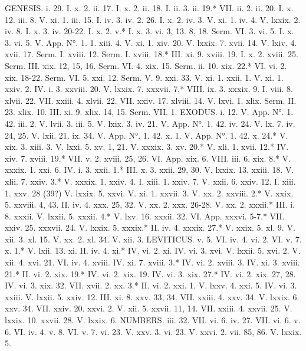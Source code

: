 GENESIS.
i. 29.	I. x. 2.
ii. 17.	I. x. 2.
ii. 18.	I. ii. 3.
ii. 19.*	VII. ii. 2.
ii. 20.	I. x. 12.
iii. 8.	V. xi. 1.
iii. 15.	I. iv. 3.
iv. 2. 26.	I. x. 2.
iv. 3.	V. xi. 1.
iv. 4.	V. lxxix. 2.
iv. 8.	I. x. 3.
iv. 20-22.	I. x. 2.
v.*	I. x. 3.
vi. 3, 13. 8, 18.	Serm. VI. 3.
vi. 5.	I. x. 3.
vi. 5.	V. App. N°. 1. 1.
xiii. 4.	V. xi. 1.
xiv. 20.	V. lxxix. 7.
xvii. 14.	V. lxiv. 4.
xvii. 17.	Serm. I.
xviii. 12.	Serm. I.
xviii. 18.*	III. xi. 9.
xviii. 19.	I. x. 2.
xviii. 25.	Serm. III.
xix. 12, 15, 16.	Serm. VI. 4.
xix. 15.	Serm. ii. 10.
xix. 22.*	VI. vi. 2.
xix. 18-22.	Serm. VI. 5.
xxi. 12.	Serm. V. 9.
xxi. 33.	V. xi. 1.
xxii. 1.	V. xi. 1.
xxiv. 2.	IV. i. 3.
xxviii. 20.	V. lxxix. 7.
xxxvii. 7.*	VIII. ix. 3.
xxxix. 9.	I. viii. 8.
xlvii. 22.	VII. xxiii. 4.
xlvii. 22.	VII. xxiv. 17.
xlviii. 14.	V. lxvi. 1.
xlix.	Serm. II. 23.
xlix. 10.	III. xi. 9.
xlix. 14, 15.	Serm. VII. 1.
EXODUS.
i. 12.	V. App. N°. 1. 42.
iii. 2.	V. lvii. 3.
iii. 5.	V. lxix. 3.
iv. 21.	V. App. N°. 1. 42.
iv. 24.	V. lx. 7.
iv. 24, 25.	V. lxii. 21.
ix. 34.	V. App. N°. 1. 42.
x. 1.	V. App. N°. 1. 42.
x. 24.*	V. xix. 3.
xiii. 3.	V. lxxi. 5.
xv. 1, 21.	V. xxxix. 3.
xv. 20.*	V. xli. 1.
xvii. 12.*	IV. xiv. 7.
xviii. 19.*	VII. v. 2.
xviii. 25, 26.	VI. App.
xix. 6.	VIII. iii. 6.
xix. 8.*	V. xxxix. 1.
xxi. 6.	IV. i. 3.
xxii. 1.*	III. x. 3.
xxii. 29, 30.	V. lxxix. 13.
xxiii. 18.	V. xlii. 7.
xxiv. 3.*	V. xxxix. 1.
xxiv. 4.	I. xiii. 1.
xxiv. 7.	V. xxii. 6.
xxiv. 12.	I. xiii. 1.
xxv. 28 (39?)	V. lxxix. 5.
xxvi.	V. xi. 1.
xxvii. 3.	V. xx. 2.
xxviii. 2.*	V. xxix. 5.
xxviii. 4, 43.	II. iv. 4.
xxx. 25, 32.	V. xx. 2.
xxx. 26-28.	V. xx. 2.
xxxii.*	III. i. 8.
xxxii.	V. lxxii. 5.
xxxii. 4.*	V. lxv. 16.
xxxii. 32.	VI. App.
xxxvi. 5-7.*	VII. xxiv. 25.
xxxvii. 24.	V. lxxix. 5.
xxxix.*	II. iv. 4.
xxxix. 27.*	V. xxix. 5.
xl. 9.	V. xii. 3.
xl. 15.	V. xx. 2.
xl. 34.	V. xii. 3.
LEVITICUS.
v. 5.	VI. iv. 4.
vi. 2.	VI. v. 7.
x. 1.*	V. lxii. 13.
xi.	II. iv. 4.
xi.*	IV. vi. 2.
xi.	IV. vi. 3.
xvi.	V. lxxii. 5.
xvi. 2.	V. xii. 4.
xvi. 21.	VI. iv. 4.
xviii.	IV. xi. 7.
xviii. 3.*	IV. vi. 2.
xviii. 3.	IV. xi. 3.
xviii. 21.*	II. vi. 2.
xix. 19.*	IV. vi. 2.
xix. 19.	IV. vi. 3.
xix. 27.*	IV. vi. 2.
xix. 27, 28.	IV. vi. 3.
xix. 32.	VII. xvii. 2.
xx. 3.*	II. vi. 2.
xxi. 1.	V. lxxv. 4.
xxi. 5.	IV. vi. 3.
xxiii.	V. lxxii. 5.
xxiv. 12.	III. xi. 8.
xxv. 33, 34.	VII. xxiii. 4.
xxv. 34.	V. lxxix. 6.
xxv. 34.	VII. xxiv. 20.
xxvi. 2.	V. xii. 5.
xxvii. 11, 14.	VII. xxiii. 4.
xxvii. 25.	V. lxxix. 10.
xxvii. 28.	V. lxxix. 6.
NUMBERS.
iii. 32.	VII. vi. 6.
iv. 27.	VII. vi. 6.
v. 6.	VI. iv. 4.
v. 8.	VI. v. 7.
vi. 23.	V. xxv. 3.
vi. 23.	V. xxvi. 2.
vii. 85, 86.	V. lxxix. 5.
